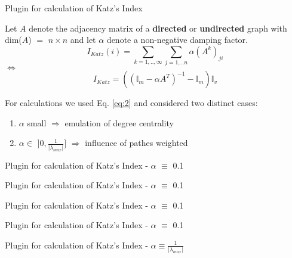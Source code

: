 \begin{frame}{Plugin for calculation of Katz's Index}
\begin{definition}
Let $A$ denote the adjacency matrix of a \textbf{directed} or \textbf{undirected} graph with dim($A$) $=$ $n \times n$ and let $\alpha$ denote a non-negative damping factor.
\begin{equation}
I_{Katz}(i) = \sum_{k=1,..,\infty} \sum_{j=1,..n} \alpha(A^k)_{ji}
\end{equation}
$\Leftrightarrow$
\begin{equation}\label{eq:2}
I_{Katz} = ((\mathbb{I}_m - \alpha A^T)^ {-1} - \mathbb{I}_m) \mathbb{I}_v
\end{equation}
\end{definition}
For calculations we used Eq. \ref{eq:2} and considered two distinct cases:
\begin{enumerate}
\item $\alpha$ small $\Rightarrow$ emulation of degree centrality
\item $\alpha \in$ $]0,\frac{1}{|\lambda_{max}|}]$ $\Rightarrow$ influence of pathes weighted
\end{enumerate}
\end{frame}
\begin{frame}{Plugin for calculation of Katz's Index - $\alpha$ $\equiv$ 0.1}

\end{frame}
\begin{frame}{Plugin for calculation of Katz's Index - $\alpha$ $\equiv$ 0.1}

\end{frame}
\begin{frame}{Plugin for calculation of Katz's Index - $\alpha$ $\equiv$ 0.1}

\end{frame}
\begin{frame}{Plugin for calculation of Katz's Index - $\alpha$ $\equiv$ 0.1}

\end{frame}
\begin{frame}{Plugin for calculation of Katz's Index - $\alpha \equiv \frac{1}{|\lambda_{max}|}$}

\end{frame}


